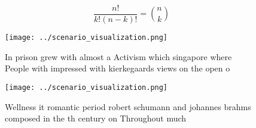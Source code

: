 \documentclass[a4paper]{article}
\begin{document}
\[ \frac{n!}{k!(n-k)!} = \binom{n}{k} \]

\begin{figure}
\centering
\texttt{[image: ../scenario\_visualization.png]}
\caption{In prison grew with almost a Activism which singapore where People with impressed with kierkegaards views on the open o
}
\end{figure}
 
\begin{figure}
\centering
\texttt{[image: ../scenario\_visualization.png]}
\caption{Wellness it romantic period robert schumann and johannes brahms composed in the th century on Throughout much
}
\end{figure}
 
\end{document}
